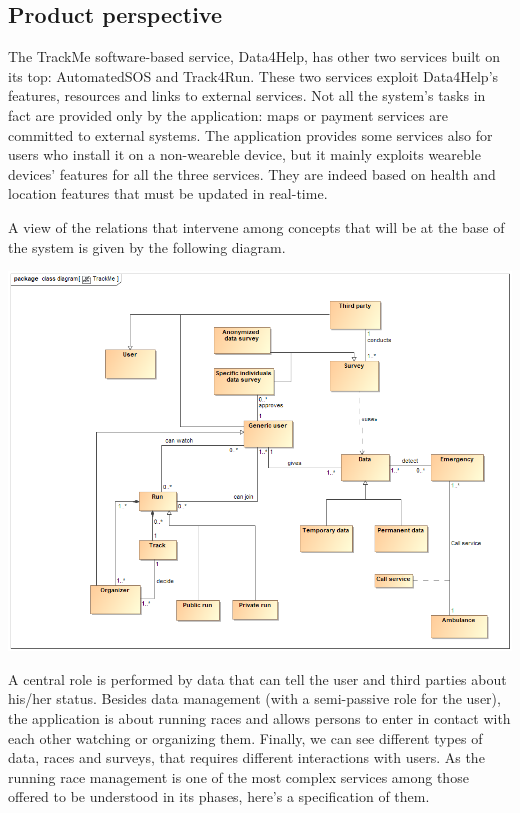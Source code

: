 
%

\subsection{Product perspective}
The TrackMe software-based service, Data4Help, has  other two services built on its top: AutomatedSOS and Track4Run. These two services exploit Data4Help's features, resources and links to external services. Not all the system's tasks in fact are provided only by the application: maps or payment services are committed to external systems. The application provides some services also for users who install it on a non-weareble device, but it mainly exploits weareble devices' features for all the three services. They are indeed based on health and location features that must be updated in real-time. \newline

A view of the relations that intervene among concepts that will be at the base of the system is given by the following diagram.

\begin{center}
\includegraphics[scale=0.5]{sections/diagrams/class_diagram.png}
\end{center}

A central role is performed by data that can tell the user and third parties about his/her status. Besides data management (with a semi-passive role for the user), the application is about running races and allows persons to enter in contact with each other watching or organizing them. Finally, we can see different types of data, races and surveys, that requires different interactions with users. \newpage
As the running race management is one of the most complex services among those offered to be understood in its phases, here's a specification of them.


